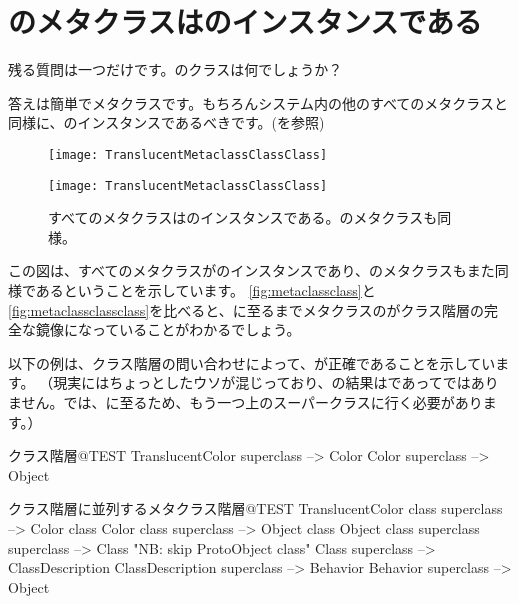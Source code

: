 \documentclass[a4paper,10pt,twoside]{book}
\begin{document}
\section{のメタクラスはのインスタンスである}

残る質問は一つだけです。のクラスは何でしょうか？

答えは簡単でメタクラスです。もちろんシステム内の他のすべてのメタクラスと同様に、のインスタンスであるべきです。(を参照)

\begin{center}
\begin{figure}
\ifluluelse
	{\centerline{\texttt{[image: TranslucentMetaclassClassClass]}}}
	{\centerline{\texttt{[image: TranslucentMetaclassClassClass]}}}
\caption{すべてのメタクラスはのインスタンスである。のメタクラスも同様。}
\end{figure}
\end{center}

この図は、すべてのメタクラスがのインスタンスであり、のメタクラスもまた同様であるということを示しています。
\ref{fig:metaclassclass}と\ref{fig:metaclassclassclass}を比べると、に至るまでメタクラスのがクラス階層の完全な鏡像になっていることがわかるでしょう。

以下の例は、クラス階層の問い合わせによって、が正確であることを示しています。
（現実にはちょっとしたウソが混じっており、の結果はであってではありません。\pharo では、に至るため、もう一つ上のスーパークラスに行く必要があります。）

\begin{example}{クラス階層}{@TEST}
TranslucentColor superclass --> Color
Color superclass                   --> Object
\end{example}

\begin{example}{クラス階層に並列するメタクラス階層}{@TEST}
TranslucentColor class superclass   --> Color class
Color class superclass                     --> Object class
Object class superclass superclass --> Class    "NB: skip ProtoObject class"
Class superclass                              --> ClassDescription
ClassDescription superclass            --> Behavior
Behavior superclass                         --> Object
\end{example}
\end{document}
